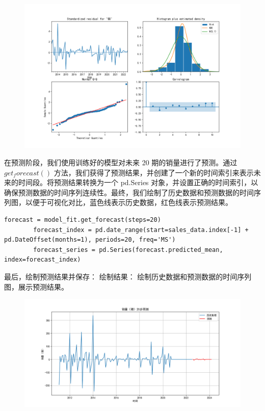 \documentclass[a4paper]{article}
\begin{document}
	\begin{figure}[H]
		\centering
		\includegraphics[width=1.0\textwidth]{img/A1_1.png}
	\end{figure}

	在预测阶段，我们使用训练好的模型对未来 20 期的销量进行了预测。通过 $get_forecast()$ 方法，我们获得了预测结果，并创建了一个新的时间索引来表示未来的时间段。将预测结果转换为一个 pd.Series 对象，并设置正确的时间索引，以确保预测数据的时间序列连续性。最终，我们绘制了历史数据和预测数据的时间序列图，以便于可视化对比，蓝色线表示历史数据，红色线表示预测结果。
	\begin{lstlisting}[caption={Python Example}, label={lst:example}]
		forecast = model_fit.get_forecast(steps=20)
		forecast_index = pd.date_range(start=sales_data.index[-1] + pd.DateOffset(months=1), periods=20, freq='MS')
		forecast_series = pd.Series(forecast.predicted_mean, index=forecast_index)
	\end{lstlisting}

	最后，绘制预测结果并保存：
	绘制结果：
	绘制历史数据和预测数据的时间序列图，展示预测结果。
	\begin{figure}[H]
		\centering
		\includegraphics[width=1.0\textwidth]{img/A1_2.png}
	\end{figure}
\end{document}
